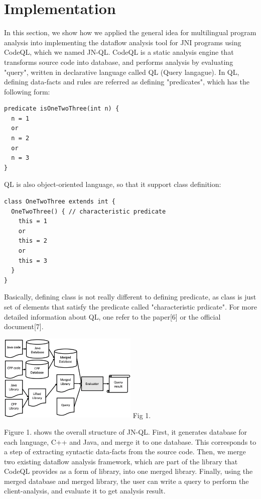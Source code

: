 \section{Implementation}
In this section, we show how we applied the general idea for multilingual
program analysis into implementing the dataflow analysis tool for JNI programs
using CodeQL, which we named JN-QL. CodeQL is a static analysis engine that
transforms source code into database, and performs analysis by evaluating
"query", written in declarative language called QL (Query langague). In QL,
defining data-facts and rules are referred as defining "predicates", which has
the following form:
\begin{lstlisting}[style=codeql,xleftmargin=2.5em]
predicate isOneTwoThree(int n) {
  n = 1
  or
  n = 2
  or
  n = 3
}
\end{lstlisting}

QL is also object-oriented language, so that it support class definition:
\begin{lstlisting}[style=codeql,xleftmargin=2.5em]
class OneTwoThree extends int {
  OneTwoThree() { // characteristic predicate
    this = 1
    or
    this = 2
    or
    this = 3
  }
}
\end{lstlisting}

Basically, defining class is not really different to defining predicate,
as class is just set of elements that satisfy the predicate called
"characteristic prdicate". For more detailed information about QL, one
refer to the paper[6] or the official document[7].

\includegraphics[width=0.5\textwidth]{img/Fig1}
Fig 1.

Figure 1. shows the overall structure of JN-QL. First, it generates database
for each language, C++ and Java, and merge it to one database. This corresponds to a step of
extracting syntactic data-facts from the source code. Then, we merge two
existing dataflow analysis framework, which are part of the library that 
CodeQL provides as a form of library, into one merged library. Finally, using the
merged database and merged library, the user can write a query to perform the
client-analysis, and evaluate it to get analysis result.

